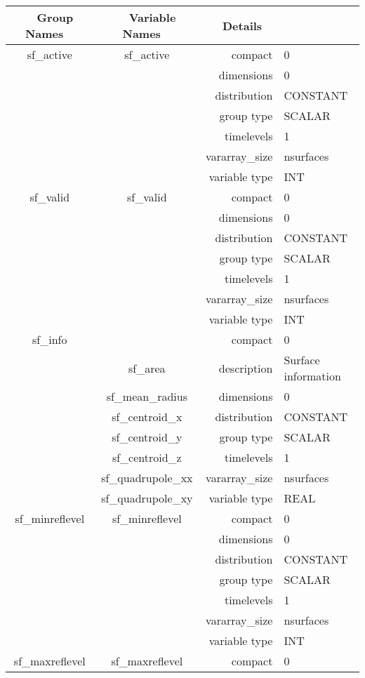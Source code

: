 \vspace{5mm}

\begin{tabular*}{150mm}{|c|c@{\extracolsep{\fill}}|rl|} \hline 
~ {\bf Group Names} ~ & ~ {\bf Variable Names} ~  &{\bf Details} ~ & ~\\ 
\hline 
sf\_active & sf\_active & compact & 0 \\ 
 &  & dimensions & 0 \\ 
 &  & distribution & CONSTANT \\ 
 &  & group type & SCALAR \\ 
 &  & timelevels & 1 \\ 
 &  & vararray\_size & nsurfaces \\ 
 &  & variable type & INT \\ 
\hline 
sf\_valid & sf\_valid & compact & 0 \\ 
 &  & dimensions & 0 \\ 
 &  & distribution & CONSTANT \\ 
 &  & group type & SCALAR \\ 
 &  & timelevels & 1 \\ 
 &  & vararray\_size & nsurfaces \\ 
 &  & variable type & INT \\ 
\hline 
sf\_info &  & compact & 0 \\ 
 & sf\_area & description & Surface information \\ 
 & sf\_mean\_radius & dimensions & 0 \\ 
 & sf\_centroid\_x & distribution & CONSTANT \\ 
 & sf\_centroid\_y & group type & SCALAR \\ 
 & sf\_centroid\_z & timelevels & 1 \\ 
 & sf\_quadrupole\_xx & vararray\_size & nsurfaces \\ 
 & sf\_quadrupole\_xy & variable type & REAL \\ 
\hline 
sf\_minreflevel & sf\_minreflevel & compact & 0 \\ 
 &  & dimensions & 0 \\ 
 &  & distribution & CONSTANT \\ 
 &  & group type & SCALAR \\ 
 &  & timelevels & 1 \\ 
 &  & vararray\_size & nsurfaces \\ 
 &  & variable type & INT \\ 
\hline 
sf\_maxreflevel & sf\_maxreflevel & compact & 0 \\ 

\end{tabular*}
